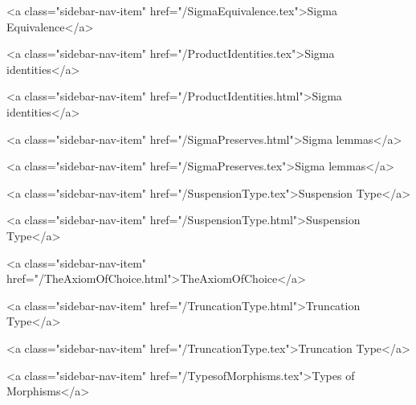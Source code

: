       
        
          <a class="sidebar-nav-item" href="/SigmaEquivalence.tex">Sigma Equivalence</a>
        
      
    
      
        
          <a class="sidebar-nav-item" href="/ProductIdentities.tex">Sigma identities</a>
        
      
    
      
        
          <a class="sidebar-nav-item" href="/ProductIdentities.html">Sigma identities</a>
        
      
    
      
        
          <a class="sidebar-nav-item" href="/SigmaPreserves.html">Sigma lemmas</a>
        
      
    
      
        
          <a class="sidebar-nav-item" href="/SigmaPreserves.tex">Sigma lemmas</a>
        
      
    
      
        
          <a class="sidebar-nav-item" href="/SuspensionType.tex">Suspension Type</a>
        
      
    
      
        
          <a class="sidebar-nav-item" href="/SuspensionType.html">Suspension Type</a>
        
      
    
      
        
          <a class="sidebar-nav-item" href="/TheAxiomOfChoice.html">TheAxiomOfChoice</a>
        
      
    
      
        
          <a class="sidebar-nav-item" href="/TruncationType.html">Truncation Type</a>
        
      
    
      
        
          <a class="sidebar-nav-item" href="/TruncationType.tex">Truncation Type</a>
        
      
    
      
        
          <a class="sidebar-nav-item" href="/TypesofMorphisms.tex">Types of Morphisms</a>
        
